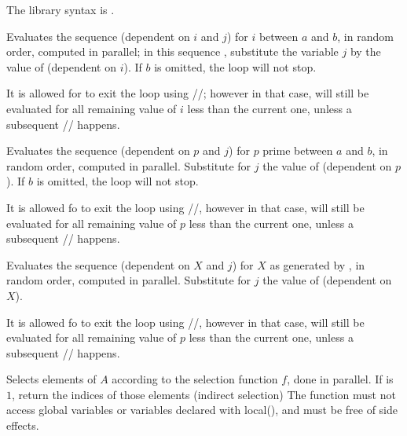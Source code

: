 {The library syntax is .

\label{se:parfor}
Evaluates the sequence  (dependent on $i$ and $j$) for $i$
between $a$ and $b$, in random order, computed in parallel; in this sequence
, substitute the variable $j$ by the value of 
(dependent on $i$). If $b$ is omitted, the loop will not stop.

It is allowed for  to exit the loop using
//; however in that case,  will
still be evaluated for all remaining value of $i$ less than the current one,
unless a subsequent // happens.

\label{se:parforprime}
Evaluates the sequence  (dependent on $p$ and $j$) for $p$
prime between $a$ and $b$, in random order, computed in parallel. Substitute
for $j$ the value of  (dependent on $p$).
If $b$ is omitted, the loop will not stop.

It is allowed fo  to exit the loop using
//, however in that case,  will
still be evaluated for all remaining value of $p$ less than the current one,
unless a subsequent // happens.

\label{se:parforvec}
Evaluates the sequence  (dependent on $X$ and $j$) for $X$
as generated by , in random order, computed in parallel. Substitute
for $j$ the value of  (dependent on $X$).

It is allowed fo  to exit the loop using
//, however in that case,  will
still be evaluated for all remaining value of $p$ less than the current one,
unless a subsequent // happens.

\label{se:parselect}
Selects elements of $A$ according to the selection function $f$, done in
parallel.  If \fl is $1$, return the indices of those elements (indirect
selection) The function  must not access global variables or
variables declared with local(), and must be free of side effects.

}
